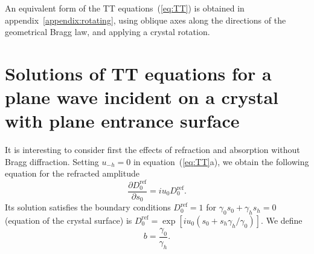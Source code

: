 \documentclass{iucr}
\begin{document}
An equivalent form of the TT equations~(\ref{eq:TT}) is obtained in appendix~\ref{appendix:rotating}, using oblique axes along the directions of the geometrical Bragg law, and applying a crystal rotation.



%
\section{Solutions of TT equations  for a plane wave incident on a crystal with plane entrance surface}
\label{sec:TTsolutions}

It is interesting to consider first the effects of refraction and absorption without Bragg diffraction. 
Setting $u_{-h}=0$ in equation~(\ref{eq:TT}a), we obtain the following equation for the refracted amplitude 
\begin{equation}\label{eq:refraction}
\frac{\partial D_0^{\text{ref}}}{\partial s_0} = i u_0 D_0^{\text{ref}}.
\end{equation}
Its solution satisfies the boundary conditions $D_0^{\text{ref}}=1$ for  $\gamma_0 s_0 + \gamma_h s_h =0$ (equation of the crystal surface) is $D_0^{\text{ref}}= \exp[i u_0 (s_0 + s_h \gamma_h/\gamma_0)]$.
We define
\begin{equation}\label{eq:b}
b = \frac{\gamma_0}{\gamma_h}.    
\end{equation}
\end{document}
